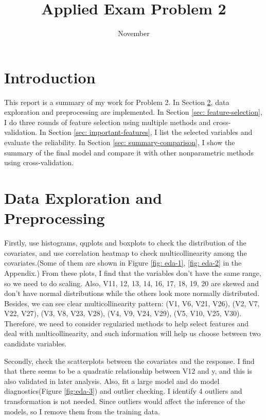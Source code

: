 \documentclass[11pt a4paper]{article}
\begin{document}
	
	\title{\vspace{-1in}Applied Exam Problem 2}
	\author{November}  %
	\date{\vspace{-5ex}}  %
	\maketitle
	
	\section{Introduction}
	This report is a summary of my work for Problem 2. In Section \ref{sec: eda}, data exploration and preprocessing are implemented. In Section \ref{sec: feature-selection}, I do three rounds of feature selection using multiple methods and cross-validation. In Section \ref{sec: important-features}, I list the selected variables and evaluate the reliability. In Section \ref{sec: summary-comparison}, I show the summary of the final model and compare it with other nonparametric methods using cross-validation.
	
	\section{Data Exploration and Preprocessing}\label{sec: eda}
	Firstly, use histograms, qqplots and boxplots to check the distribution of the covariates, and use correlation heatmap to check multicollinearity among the covariates.(Some of them are shown in Figure \ref{fig: eda-1}, \ref{fig: eda-2} in the Appendix.) From these plots, I find that the variables don't have the same range, so we need to do scaling. Also, V11, 12, 13, 14, 16, 17, 18, 19, 20 are skewed and don't have normal distributions while the others look more normally distributed. Besides, we can see clear multicollinearity pattern: (V1, V6, V21, V26), (V2, V7, V22, V27), (V3, V8, V23, V28), (V4, V9, V24, V29), (V5, V10, V25, V30). Therefore, we need to consider regularied methods to help select features and deal with multicollinearity, and such information will help us choose between two candidate variables. 
	
	Secondly, check the scatterplots between the covariates and the response. I find that there seems to be a quadratic relationship between V12 and y, and this is also validated in later analysis. Also, fit a large model and do model diagnostics(Figure \ref{fig:eda-3}) and outlier checking. I identify 4 outliers and transformation is not needed. Since outliers would affect the inference of the models, so I remove them from the training data. 
	
\end{document}
